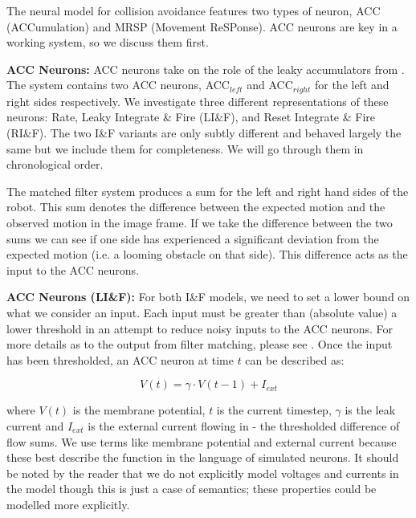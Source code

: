 \documentclass[a4paper,11pt,twoside,openright]{article}
\begin{document}
The neural model for collision avoidance features two types of neuron, ACC
(ACCumulation) and MRSP (Movement ReSPonse). ACC neurons are key in a working
system, so we discuss them first.
\newline\par

\textbf{ACC Neurons:}
ACC neurons take on the role of the leaky accumulators from \cite{Mitchell2018,
  Stewart2010}. The system contains two ACC neurons, ACC$_{left}$ and
ACC$_{right}$ for the left and right sides respectively. We investigate three
different representations of these neurons: Rate, Leaky Integrate \& Fire
(LI\&F), and Reset Integrate \& Fire (RI\&F). The two I\&F variants are only
subtly different and behaved largely the same but we include them for
completeness. We will go through them in chronological order.
\newline\par

The matched filter system produces a sum for the left and right hand sides of the
robot. This sum denotes the difference between the expected motion and the
observed motion in the image frame. If we take the difference between the two
sums we can see if one side has experienced a significant deviation from the
expected motion (i.e. a looming obstacle on that side). This difference acts
as the input to the ACC neurons.
\newline\par

\textbf{ACC Neurons (LI\&F):} For both I\&F models, we need to set a
lower bound on what we consider an input.  Each input must be greater
than (absolute value) a lower threshold in an attempt to reduce noisy
inputs to the ACC neurons. For more details as to the output from
filter matching, please see \cite{Mitchell2018}. Once the input has
been thresholded, an ACC neuron at time $t$ can be described as:

\begin{equation}
  V(t) = \gamma \cdot V(t-1) + I_{ext}
\end{equation}

where $V(t)$ is the membrane potential, $t$ is the current timestep,
$\gamma$ is the leak current and $I_{ext}$ is the external current
flowing in - the thresholded difference of flow sums.  We use terms
like membrane potential and external current because these best
describe the function in the language of simulated neurons. It should
be noted by the reader that we do not explicitly model voltages and
currents in the model though this is just a case of semantics; these
properties could be modelled more explicitly.
\newline\par
\end{document}
